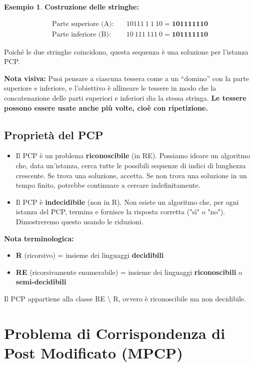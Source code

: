 \documentclass[a4paper]{article}
\theoremstyle{definition} %
\newtheorem{example}{Esempio}
\theoremstyle{remark} %
\begin{document}
\begin{example}
\textbf{Costruzione delle stringhe:}

\begin{align*}
  \text{Parte superiore (A):}\quad & 10111\ 1\ 1\ 10 = \textbf{101111110} \\
  \text{Parte inferiore (B):}\quad & 10\ 111\ 111\ 0 = \textbf{101111110}
\end{align*}

Poiché le due stringhe coincidono, questa sequenza è una soluzione per l'istanza PCP.

\textbf{Nota visiva:} Puoi pensare a ciascuna tessera come a un ``domino'' con la parte superiore e inferiore, e l'obiettivo è allineare le tessere in modo che la concatenazione delle parti superiori e inferiori dia la stessa stringa. 
\textbf{Le tessere possono essere usate anche più volte, cioè con ripetizione.}

\end{example}

\subsection{Proprietà del PCP}
\begin{itemize}
\item Il PCP è un problema \textbf{riconoscibile} (in RE). Possiamo ideare un algoritmo che, data un'istanza, cerca tutte le possibili sequenze di indici di lunghezza crescente. Se trova una soluzione, accetta. Se non trova una soluzione in un tempo finito, potrebbe continuare a cercare indefinitamente.
\item Il PCP è \textbf{indecidibile} (non in R). Non esiste un algoritmo che, per ogni istanza del PCP, termina e fornisce la risposta corretta ("sì" o "no"). Dimostreremo questo usando le riduzioni.
\end{itemize}

\textbf{Nota terminologica:}
\begin{itemize}
\item \textbf{R} (ricorsivo) = insieme dei linguaggi \textbf{decidibili}
\item \textbf{RE} (ricorsivamente enumerabile) = insieme dei linguaggi \textbf{riconoscibili} o \textbf{semi-decidibili}
\end{itemize}

Il PCP appartiene alla classe RE $\setminus$ R, ovvero è riconoscibile ma non decidibile.

\section{Problema di Corrispondenza di Post Modificato (MPCP)}
\end{document}

